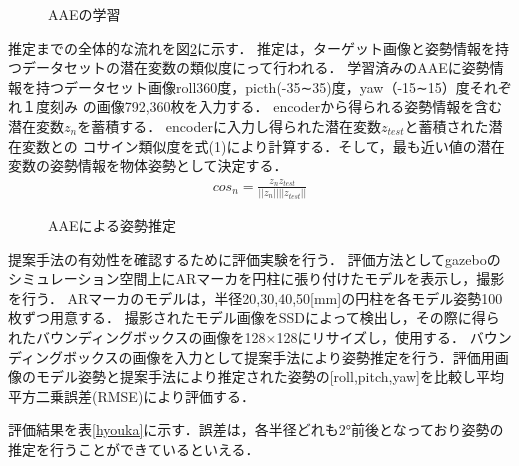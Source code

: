 \documentclass{jsarticle}
\begin{document}
\begin{figure}[ht]
\vspace{-7zh}
\setlength{\epsfxsize}{7.5cm}
\centerline{}
\vspace{5zh}
\caption{AAEの学習}
\label{BB}
\vspace{-1.0zh}
\end{figure}




推定までの全体的な流れを図\ref{GG}に示す．
推定は，ターゲット画像と姿勢情報を持つデータセットの潜在変数の類似度にって行われる．
学習済みのAAEに姿勢情報を持つデータセット画像roll360度，picth(-35∼35)度，yaw（-15∼15）度それぞれ１度刻み
の画像792,360枚を入力する．
encoderから得られる姿勢情報を含む潜在変数$z_n$を蓄積する．
encoderに入力し得られた潜在変数$z_{test}$と蓄積された潜在変数との
コサイン類似度を式(1)により計算する．そして，最も近い値の潜在変数の姿勢情報を物体姿勢として決定する．
\begin{eqnarray}
\label{cos}
cos_n=\frac{z_n z_{test}}{||z_n|| ||z_{test}||}
\end{eqnarray}


\begin{figure}[ht]
\vspace{-5zh}
\setlength{\epsfxsize}{7.5cm}
\centerline{}
\vspace{5zh}
\caption{AAEによる姿勢推定}
\label{GG}
\vspace{-1.0zh}
\end{figure}





提案手法の有効性を確認するために評価実験を行う．
評価方法としてgazeboのシミュレーション空間上にARマーカを円柱に張り付けたモデルを表示し，撮影を行う．
ARマーカのモデルは，半径20,30,40,50[mm]の円柱を各モデル姿勢100枚ずつ用意する．
撮影されたモデル画像をSSDによって検出し，その際に得られたバウンディングボックスの画像を128$\times$128にリサイズし，使用する．
バウンディングボックスの画像を入力として提案手法により姿勢推定を行う．評価用画像のモデル姿勢と提案手法により推定された姿勢の[roll,pitch,yaw]を比較し平均平方二乗誤差(RMSE)により評価する．

評価結果を表\ref{hyouka}に示す．誤差は，各半径どれも2°前後となっており姿勢の推定を行うことができているといえる．
\end{document}
